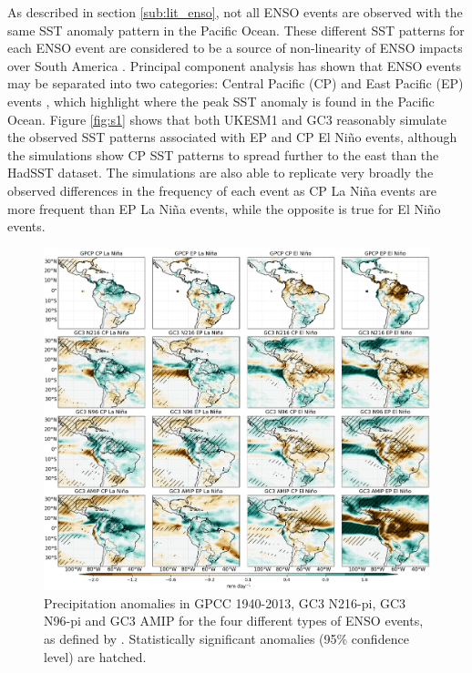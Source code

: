   
As described in section \ref{sub:lit_enso}, not all ENSO events are observed with the same SST anomaly pattern in the Pacific Ocean. These different SST patterns for each ENSO event are considered to be a source of non-linearity of ENSO impacts over South America \citep{sulca2018,cai2020}.
Principal component analysis has shown that ENSO events may be separated into two categories: Central Pacific (CP) and East Pacific (EP) events \citep{cai2020}, which highlight where the peak SST anomaly is found in the Pacific Ocean.
Figure \ref{fig:s1} shows that both UKESM1 and GC3 reasonably simulate the observed SST patterns associated with EP and CP El Niño events, although the simulations show CP SST patterns to spread further to the east than the HadSST dataset.
The simulations are also able to replicate very broadly the observed differences in the frequency of each event as CP La Niña events are more frequent than EP La Niña events, while the opposite is true for El Niño events.

\begin{figure}[t!]
\includegraphics[width=\linewidth]{figures/cppranomalies_ff}
\caption[Precipitation anomalies to different ENSO flavours]{Precipitation anomalies in GPCC 1940-2013, GC3 N216-pi, GC3 N96-pi and GC3 AMIP for the four different types of ENSO events, as defined by \cite{cai2020}. Statistically significant anomalies (95\% confidence level) are hatched.}
\label{fig:senso}
\end{figure}  

